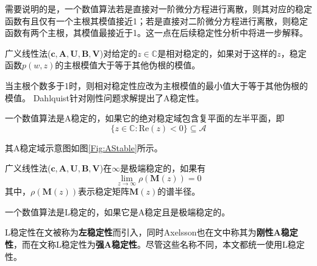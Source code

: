 需要说明的是，一个数值算法若是直接对一阶微分方程进行离散，则其对应的稳定函数有且仅有一个主根其模值接近1；若是直接对二阶微分方程进行离散，则稳定函数有两个主根，其模值最接近于1。这一点在后续稳定性分析中将进一步解释。
\begin{definition}[相对稳定性]
广义线性法($\bm{c},\bm{A},\bm{U},\bm{B},\bm{V}$)对给定的$z\in\mathbb{C}$是相对稳定的\cite{Gear1971c,YuanZhaoDing1987a}，如果对于这样的$z$，稳定函数$p(w,z)$的主根模值大于等于其他伪根的模值。
\end{definition}
当主根个数多于1时，则相对稳定性应改为主根模值的最小值大于等于其他伪根的模值。
Dahlquist针对刚性问题求解提出了A稳定性\cite{Dahlquist1963a}。
\begin{definition}[A稳定性]
一个数值算法是A稳定的\cite{Dahlquist1963a,Jackiewicz2009a,ErnstHairer1996a}，如果它的绝对稳定域包含复平面的左半平面，即
\begin{equation}
\{z\in\mathbb{C}:\text{Re}(z)<0\}\subseteq\mathcal{A}
\end{equation}
\end{definition}
其A稳定域示意图如图\ref{Fig:AStable}所示。
\begin{figure}[htpb]
\centering
{}
\end{figure}

\begin{definition}[极端稳定的]
广义线性法($\bm{c},\bm{A},\bm{U},\bm{B},\bm{V}$)在$\infty$是极端稳定的\cite{LiShouFo2010a}，如果有
\begin{equation}
\lim_{z\to\infty}\rho(\bm{M}(z))=0
\end{equation}
其中，$\rho(\bm{M}(z))$表示稳定矩阵$\bm{M}(z)$的谱半径。
\end{definition}
\begin{definition}[L稳定性]
一个数值算法是L稳定的\cite{Butcher2016a,LiShouFo2010a,Jackiewicz2009a}，如果它是A稳定且是极端稳定的。
\end{definition}
L稳定性在文被称为\textbf{左稳定性}而引入，同时Axelsson也在文中称其为\textbf{刚性A稳定性}，而在文称L稳定性为\textbf{强A稳定性}。尽管这些名称不同，本文都统一使用L稳定性。

